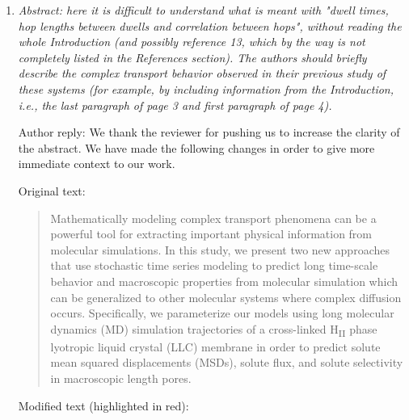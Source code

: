 \documentclass{article}
\begin{document}
\begin{enumerate}[label={Comment \theenumi :}, leftmargin=3.9\parindent]  

    \item \textit{ Abstract: here it is difficult to understand what is meant with "dwell times, hop 
    lengths between dwells and correlation between hops", without reading the whole Introduction (and 
    possibly reference 13, which by the way is not completely listed in the References section). The 
    authors should briefly describe the complex transport behavior observed in their previous study of
    these systems (for example, by including information from the Introduction, i.e., the last paragraph
    of page 3 and first paragraph of page 4).}
    
    Author reply: We thank the reviewer for pushing us to increase the clarity of the abstract. We have
    made the following changes in order to give more immediate context to our work.
    
    Original text:
    
    \begin{quote}
    Mathematically modeling complex transport phenomena can be a powerful tool
    for extracting important physical information from molecular simulations. 
    In this study, we present two new approaches that use stochastic time series
    modeling to predict long time-scale behavior and macroscopic properties 
    from molecular simulation which can be generalized to other molecular systems
    where complex diffusion occurs. Specifically, we parameterize our models using
    long molecular dynamics (MD) simulation trajectories of a cross-linked 
    H\textsubscript{II} phase lyotropic liquid crystal (LLC) membrane in order to
    predict solute mean squared displacements (MSDs), solute flux, and
    solute selectivity in macroscopic length pores.    
    \end{quote}
    
	Modified text (highlighted in red):
	

\end{enumerate}
\end{document}
